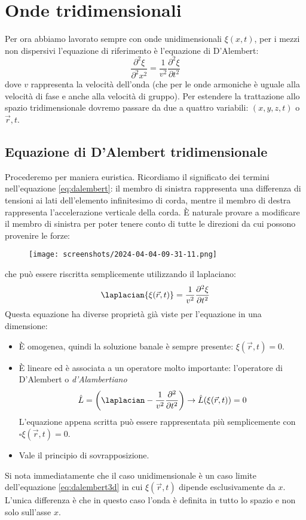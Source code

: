 \chapter{Onde tridimensionali}

Per ora abbiamo lavorato sempre con onde unidimensionali \(\xi (x,t)\), per i mezzi non dispersivi l'equazione di riferimento è l'equazione di D'Alembert:
\begin{equation}\label{eq:dalembert}
	\frac{\partial ^{2} \xi }{\partial ^{2} x^{2} }= \frac{1}{v^{2} }\frac{\partial ^{2} \xi }{\partial t ^{2} }  
\end{equation}
dove \(v\) rappresenta la velocità dell'onda (che per le onde armoniche è uguale alla velocità di fase e anche alla velocità di gruppo).
Per estendere la trattazione allo spazio tridimensionale dovremo passare da due a quattro variabili: \((x,y,z,t)\) o \(\vec{r} , t\).
\section{Equazione di D'Alembert tridimensionale}
Procederemo per maniera euristica. Ricordiamo il significato dei termini nell'equazione \eqref{eq:dalembert}: il membro di sinistra rappresenta una differenza di tensioni ai lati dell'elemento infinitesimo di corda, mentre il membro di destra rappresenta l'accelerazione verticale della corda. È naturale provare a modificare il membro di sinistra per poter tenere conto di tutte le direzioni da cui possono provenire le forze:
\begin{figure}[H]
	\centering
	\texttt{[image: screenshots/2024-04-04-09-31-11.png]}
\end{figure}
\noindent che può essere riscritta semplicemente utilizzando il laplaciano:
\begin{equation} \label{eq:dalembert3d}
	\laplacian{\xi (\vec{r} , t)}= \frac{1}{v^{2} }\frac{\partial ^{2} \xi }{\partial t ^{2} } 
\end{equation}
Questa equazione ha diverse proprietà già viste per l'equazione in una dimensione:
\begin{itemize}
	\item È omogenea, quindi la soluzione banale è sempre presente: \(\xi (\vec{r} , t)=0\).
	\item È lineare ed è associata a un operatore molto importante: l'operatore di D'Alembert o \emph{d'Alambertiano}
	\[
		\hat{L} = \left( \laplacian - \frac{1}{v^{2} }\frac{\partial ^{2} }{\partial t ^{2} }  \right) \to \hat{L} (\xi (\vec{r} , t))=0
	\]
	L'equazione appena scritta può essere rappresentata più semplicemente con \(\square \xi (\vec{r} , t) = 0\).	
	\item Vale il principio di sovrapposizione.
\end{itemize}
Si nota immediatamente che il caso unidimensionale è un caso limite dell'equazione \eqref{eq:dalembert3d} in cui \(\xi (\vec{r} , t)\) dipende esclusivamente da \(x\). L'unica differenza è che in questo caso l'onda è definita in tutto lo spazio e non solo sull'asse \(x\).

